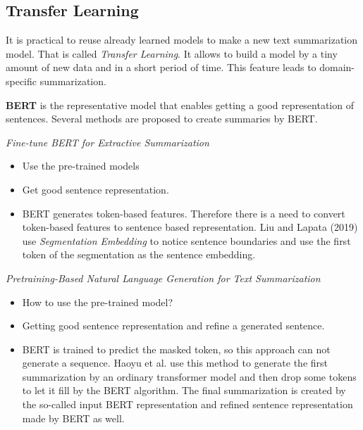\subsection{Transfer Learning}

It is practical to reuse already learned models to make a new text summarization model. That is called \textit{Transfer Learning}. It allows to build a model by a tiny amount of new data and in a short period of time. This feature leads to domain-specific summarization.

\textbf{BERT} is the representative model that enables getting a good representation of sentences. Several methods are proposed to create summaries by BERT.

\textit{Fine-tune BERT for Extractive Summarization}

\begin{itemize}
	\item Use the pre-trained models
	\item Get good sentence representation.
	\item BERT generates token-based features. Therefore there is a need to convert token-based features to sentence based representation. Liu and Lapata (2019) \cite{liu-lapata-2019-text} use \textit{Segmentation Embedding} to notice sentence boundaries and use the first token of the segmentation as the sentence embedding.
\end{itemize}

\textit{Pretraining-Based Natural Language Generation for Text Summarization}

\begin{itemize}
	\item How to use the pre-trained model?
	\item Getting good sentence representation and refine a generated sentence.
	\item BERT is trained to predict the masked token, so this approach can not generate a sequence. Haoyu et al. \cite{bert} use this method to generate the first summarization by an ordinary transformer model and then drop some tokens to let it fill by the BERT algorithm. The final summarization is created by the so-called input BERT representation and refined sentence representation made by BERT as well.
\end{itemize}
